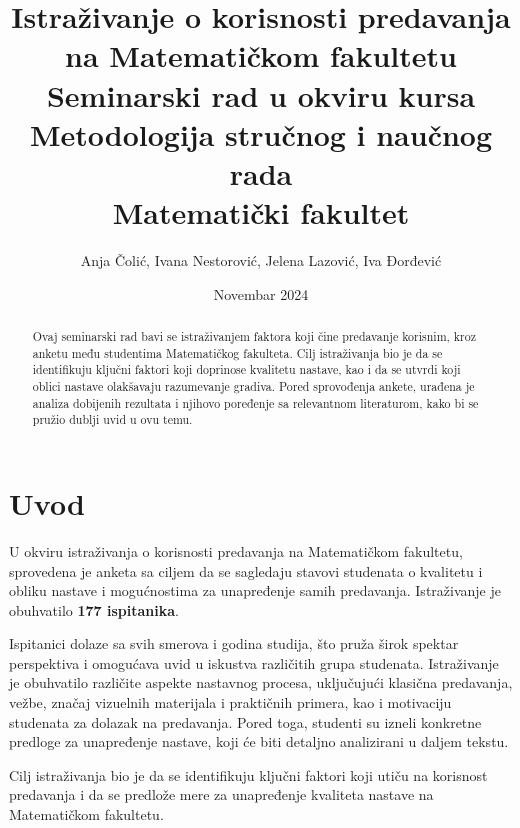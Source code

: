 \documentclass{article}
\title{Istraživanje o korisnosti predavanja na Matematičkom fakultetu \\ \large Seminarski rad u okviru kursa \\ Metodologija stručnog i naučnog rada \\ Matematički fakultet}
\author{Anja Čolić, Ivana Nestorović, Jelena Lazović, Iva Đorđević}
\date{Novembar 2024}
\begin{document}
\maketitle

\begin{abstract}
Ovaj seminarski rad bavi se istraživanjem faktora koji čine predavanje korisnim, kroz anketu među studentima Matematičkog fakulteta. Cilj istraživanja bio je da se identifikuju ključni faktori koji doprinose kvalitetu nastave, kao i da se utvrdi koji oblici nastave olakšavaju razumevanje gradiva. Pored sprovođenja ankete, urađena je analiza dobijenih rezultata i njihovo poređenje sa relevantnom literaturom, kako bi se pružio dublji uvid u ovu temu.
\end{abstract}

\tableofcontents

\section{Uvod}

U okviru istraživanja o korisnosti predavanja na Matematičkom fakultetu, sprovedena je anketa sa ciljem da se sagledaju stavovi studenata o kvalitetu i obliku nastave i mogućnostima za unapređenje samih predavanja. Istraživanje je obuhvatilo \textbf{177 ispitanika}.

Ispitanici dolaze sa svih smerova i godina studija, što pruža širok spektar perspektiva i omogućava uvid u iskustva različitih grupa studenata. Istraživanje je obuhvatilo različite aspekte nastavnog procesa, uključujući klasična predavanja, vežbe, značaj vizuelnih materijala i praktičnih primera, kao i motivaciju studenata za dolazak na predavanja. Pored toga, studenti su izneli konkretne predloge za unapređenje nastave, koji će biti detaljno analizirani u daljem tekstu.

Cilj istraživanja bio je da se identifikuju ključni faktori koji utiču na korisnost predavanja i da se predlože mere za unapređenje kvaliteta nastave na Matematičkom fakultetu.
\end{document}
